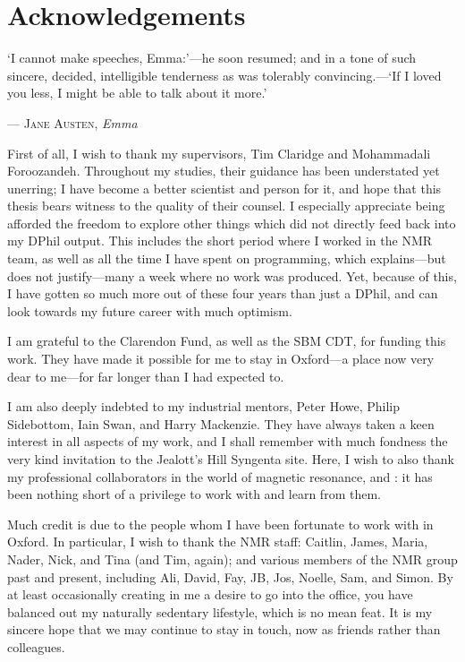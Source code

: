 \chapter{Acknowledgements}

\epigraph{\singlespacing%
`I cannot make speeches, Emma:'---he soon resumed; and in a tone of such sincere, decided, intelligible tenderness as was tolerably convincing.---`If I loved you less, I might be able to talk about it more.'
}{--- \textsc{Jane Austen}, \textit{Emma}}


First of all, I wish to thank my supervisors, Tim Claridge and Mohammadali Foroozandeh.
Throughout my studies, their guidance has been understated yet unerring; I have become a better scientist and person for it, and hope that this thesis bears witness to the quality of their counsel.
I especially appreciate being afforded the freedom to explore other things which did not directly feed back into my DPhil output.
This includes the short period where I worked in the NMR team, as well as all the time I have spent on programming, which explains---but does not justify---many a week where no work was produced.
Yet, because of this, I have gotten so much more out of these four years than just a DPhil, and can look towards my future career with much optimism.

I am grateful to the Clarendon Fund, as well as the SBM CDT, for funding this work.
They have made it possible for me to stay in Oxford---a place now very dear to me---for far longer than I had expected to.

I am also deeply indebted to my industrial mentors, Peter Howe, Philip Sidebottom, Iain Swan, and Harry Mackenzie.
They have always taken a keen interest in all aspects of my work, and I shall remember with much fondness the very kind invitation to the Jealott's Hill Syngenta site.
Here, I wish to also thank my professional collaborators in the world of magnetic resonance, \EK{} and \JND{}: it has been nothing short of a privilege to work with and learn from them.

Much credit is due to the people whom I have been fortunate to work with in Oxford.
In particular, I wish to thank the NMR staff: Caitlin, James, Maria, Nader, Nick, and Tina (and Tim, again); and various members of the NMR group past and present, including Ali, David, Fay, JB, Jos, Noelle, Sam, and Simon.
By at least occasionally creating in me a desire to go into the office, you have balanced out my naturally sedentary lifestyle, which is no mean feat.
It is my sincere hope that we may continue to stay in touch, now as friends rather than colleagues.

